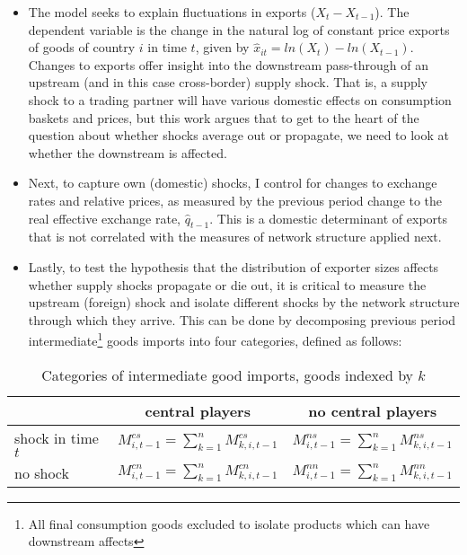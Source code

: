 \documentclass[10pt,letterpaper]{article}
\begin{document}
\begin{itemize}
\item The model seeks to explain fluctuations in exports ($X_t - X_{t-1}$). The dependent variable is the change in the natural log of constant price exports of goods of country $i$ in time $t$, given by $\hat{x}_{it} = ln(X_t) - ln(X_{t-1})$. Changes to exports offer insight into the downstream pass-through of an upstream (and in this case cross-border) supply shock. That is, a supply shock to a trading partner will have various domestic effects on consumption baskets and prices, but this work argues that to get to the heart of the question about whether shocks average out or propagate, we need to look at whether the downstream is affected.
\item Next, to capture own (domestic) shocks, I control for changes to exchange rates and relative prices, as measured by the previous period change to the real effective exchange rate, $\hat{q}_{t-1}$. This is a domestic determinant of exports that is not correlated with the measures of network structure applied next.
\item Lastly, to test the hypothesis that the distribution of exporter sizes affects whether supply shocks propagate or die out, it is critical to measure the upstream (foreign) shock and isolate different shocks by the network structure through which they arrive. This can be done by decomposing previous period intermediate\footnote{All final consumption goods excluded to isolate products which can have downstream affects} goods imports into four categories, defined as follows:
\end{itemize}



	\begin{table}[h]\centering \caption{Categories of intermediate good imports, goods indexed by $k$ \label{mtab}}
	\begin{tabular}{l | c | c}
	\toprule
	 & central players & no central players \\
	 \midrule
	 shock in time $t$ & $M^{cs}_{i,t-1} = \sum_{k=1}^{n} M^{cs}_{k,i,t-1}$ & $M^{ns}_{i,t-1} = \sum_{k=1}^{n}M^{ns}_{k,i,t-1}$ \\
	 \midrule
	 no shock & $M^{cn}_{i,t-1} = \sum_{k=1}^{n} M^{cn}_{k,i,t-1}$ & $M^{nn}_{i,t-1} = \sum_{k=1}^{n}M^{nn}_{k,i,t-1}$ \\
	 \bottomrule
	\end{tabular}
	\end{table}
	
	\vspace{2mm}
	
\end{document}
